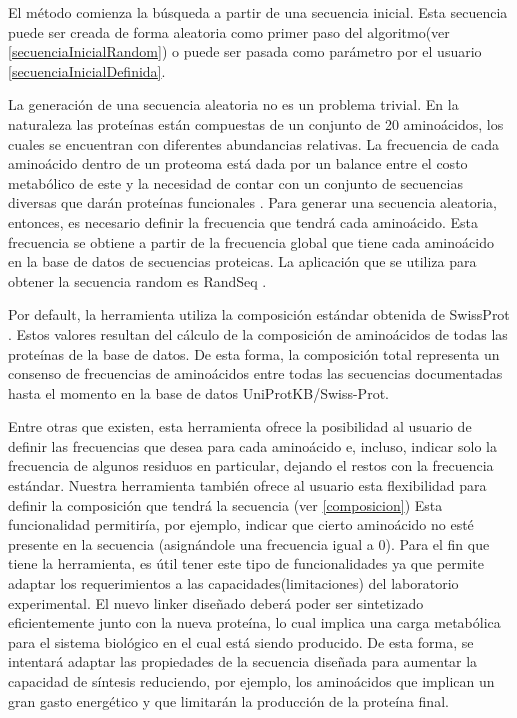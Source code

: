 El método comienza la búsqueda a partir de una secuencia inicial. 
Esta secuencia puede ser creada de forma aleatoria como primer paso del algoritmo(ver \ref{secuenciaInicialRandom}) o puede ser pasada como parámetro por el usuario \ref{secuenciaInicialDefinida}. 

La generación de una secuencia aleatoria no es un problema trivial. 
En la naturaleza las proteínas están compuestas de un conjunto de 20 aminoácidos, los cuales se encuentran con diferentes abundancias relativas. 
La frecuencia de cada aminoácido dentro de un proteoma está dada por un balance entre el costo metabólico de este y la necesidad de contar con un conjunto de secuencias diversas que darán proteínas funcionales \cite{krick2014amino}. 
Para generar una secuencia aleatoria, entonces, es necesario definir la frecuencia que tendrá cada aminoácido. 
Esta frecuencia se obtiene a partir de la frecuencia global que tiene cada aminoácido en la base de datos de secuencias proteicas.
La aplicación que se utiliza para obtener la secuencia random es RandSeq \cite{randseq}.

Por default, la herramienta utiliza la composición estándar obtenida de SwissProt \cite{compositionAA}.  
Estos valores resultan del cálculo de la composición de aminoácidos de todas las proteínas de la base de datos. 
De esta forma, la composición total representa un consenso de frecuencias de aminoácidos entre todas las secuencias documentadas hasta el momento en la base de datos UniProtKB/Swiss-Prot.

Entre otras que existen, esta herramienta ofrece la posibilidad al usuario de definir las frecuencias que desea para cada aminoácido e, incluso,
indicar solo la frecuencia de algunos residuos en particular, dejando el restos con la frecuencia estándar. 
Nuestra herramienta también ofrece al usuario esta flexibilidad para definir la composición que tendrá la secuencia (ver \ref{composicion})
Esta funcionalidad permitiría, por ejemplo, indicar que cierto aminoácido no esté presente en la secuencia (asignándole una frecuencia igual a 0). 
Para el fin que tiene la herramienta, es útil tener este tipo de funcionalidades ya que permite adaptar los requerimientos a las capacidades(limitaciones) del laboratorio experimental. 
El nuevo linker diseñado deberá poder ser sintetizado eficientemente junto con la nueva proteína, lo cual implica una carga metabólica para el sistema biológico en el cual está siendo producido. 
De esta forma, se intentará adaptar las propiedades de la secuencia diseñada para aumentar la capacidad de síntesis reduciendo, por ejemplo, los aminoácidos que implican un gran gasto energético y que limitarán la producción de la proteína final.




